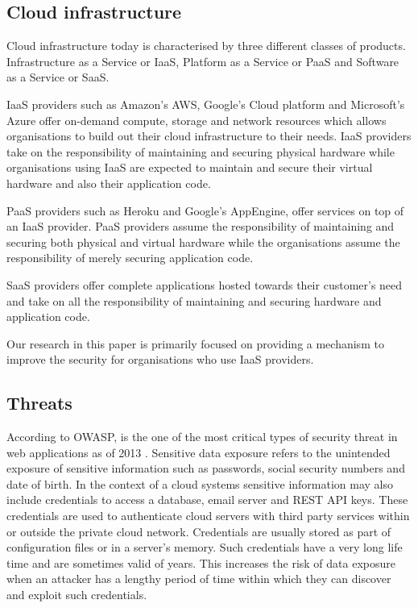 \documentclass[a4paper,twoside]{article}
\begin{document}
\subsection{Cloud infrastructure}
Cloud infrastructure today is characterised by three different classes of products. Infrastructure as a Service or IaaS, Platform as a Service or PaaS and Software as a Service or SaaS.

IaaS providers such as Amazon's AWS, Google's Cloud platform and Microsoft's Azure offer on-demand compute, storage and network resources which allows organisations to build out their cloud infrastructure to their needs. IaaS providers take on the responsibility of maintaining and securing physical hardware while organisations using IaaS are expected to maintain and secure their virtual hardware and also their application code. 

PaaS providers such as Heroku and Google's AppEngine, offer services on top of an IaaS provider. PaaS providers assume the responsibility of maintaining and securing both physical and virtual hardware while the organisations assume the responsibility of merely securing application code. 

SaaS providers offer complete applications hosted towards their customer's need and take on all the responsibility of maintaining and securing hardware and application code. 

Our research in this paper is primarily focused on providing a mechanism to improve the security for organisations who use IaaS providers.
 
\subsection{Threats}

According to OWASP,  is the one of the most critical types of security threat in web applications as of 2013 \cite{wichers_owasp_2014}. Sensitive data exposure refers to the unintended exposure of sensitive information such as passwords, social security numbers and date of birth. In the context of a cloud systems sensitive information may also include credentials to access a database, email server and REST API keys. These credentials are used to authenticate cloud servers with third party services within or outside the private cloud network. Credentials are usually stored as part of configuration files or in a server's memory. Such credentials have a very long life time and are sometimes valid of years. This increases the risk of data exposure when an attacker has a lengthy period of time within which they can discover and exploit such credentials.
\end{document}
